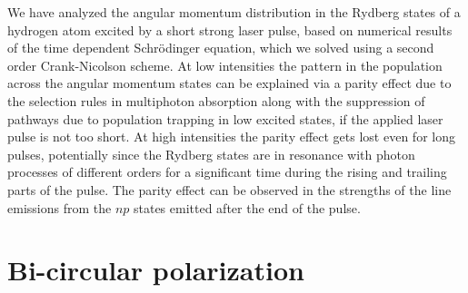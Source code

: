 We have analyzed the angular momentum distribution in the Rydberg states of a hydrogen atom excited by a short strong laser pulse, based on numerical results of the time dependent Schr\"odinger equation, which we solved using a second order Crank-Nicolson scheme. At low intensities the pattern in the population across the angular momentum states can be explained via a parity effect due to the selection rules in multiphoton absorption along with the suppression of pathways due to population trapping in low excited states, if the applied laser pulse is not too short. At high intensities the parity effect gets lost even for long pulses, potentially since the Rydberg states are in resonance with photon processes of different orders for a significant time during the rising and trailing parts of the pulse. The parity effect can be observed in the strengths of the line emissions from the $np$ states emitted after the end of the pulse. 

\section{Bi-circular polarization} %
\label{sec:bi_circular_polarization}

